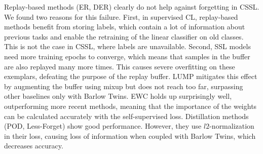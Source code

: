 Replay-based methods (ER, DER) clearly do not help against forgetting in CSSL. We found two reasons for this failure. First, in supervised CL, replay-based methods benefit from storing labels, which contain a lot of information about previous tasks and enable the retraining of the linear classifier on old classes. This is not the case in CSSL, where labels are unavailable. Second, SSL models need more training epochs to converge, which means that samples in the buffer are also replayed many more times. This causes severe overfitting on these exemplars, defeating the purpose of the replay buffer. LUMP mitigates this effect by augmenting the buffer using mixup but does not reach too far, surpassing other baselines only with Barlow Twins. EWC holds up surprisingly well, outperforming more recent methods, meaning that the importance of the weights can be calculated accurately with the self-supervised loss. Distillation methods (POD, Less-Forget) show good performance. However, they use $l2$-normalization in their loss, causing loss of information when coupled with Barlow Twins, which decreases accuracy.

